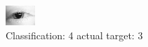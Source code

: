 \begin{figure}[h!]
\begin{center}
\includegraphics[width=0.60\columnwidth]{figures/ID94_class_4_target_3.png}
\end{center}
\caption{ Classification: 4 actual target: 3}
\label{fig:ID94_class_4_target_3}
\end{figure}
